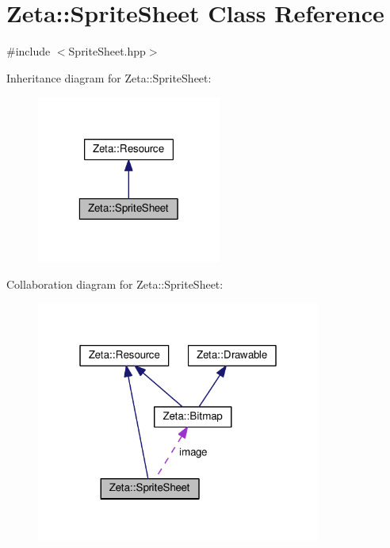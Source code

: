 \hypertarget{classZeta_1_1SpriteSheet}{\section{Zeta\+:\+:Sprite\+Sheet Class Reference}
\label{classZeta_1_1SpriteSheet}
}


{\ttfamily \#include $<$Sprite\+Sheet.\+hpp$>$}



Inheritance diagram for Zeta\+:\+:Sprite\+Sheet\+:\nopagebreak
\begin{figure}[H]
\begin{center}
\leavevmode
\includegraphics[width=172pt]{classZeta_1_1SpriteSheet__inherit__graph}
\end{center}
\end{figure}


Collaboration diagram for Zeta\+:\+:Sprite\+Sheet\+:
\nopagebreak
\begin{figure}[H]
\begin{center}
\leavevmode
\includegraphics[width=265pt]{classZeta_1_1SpriteSheet__coll__graph}
\end{center}
\end{figure}
